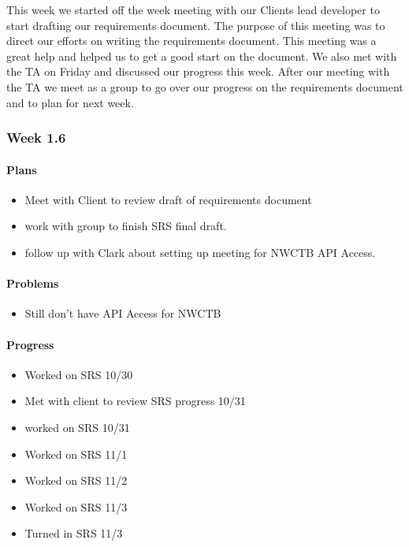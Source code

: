 \documentclass[onecolumn, draftclsnofoot,10pt, compsoc]{article}
\begin{document}
		        This week we started off the week meeting with our Clients lead developer to start drafting our requirements document. The purpose of this meeting was to direct our efforts on writing the requirements document. This meeting was a great help and helped us to get a good start on the document.  We also met with the TA on Friday and discussed our progress this week. After our meeting with the TA we meet as a group to go over our progress on the requirements document and to plan for next week.\\

		\subsubsection{Week 1.6}

		    \paragraph{Plans} \hfill \break

		        \begin{itemize}
		            \item Meet with Client to review draft of requirements document
		            \item work with group to finish SRS final draft.
		            \item follow up with Clark about setting up meeting for NWCTB API Access.
		        \end{itemize}

		    \paragraph{Problems} \hfill \break

		        \begin{itemize}
		            \item Still don't have API Access for NWCTB
		        \end{itemize}

		    \paragraph{Progress} \hfill \break

		        \begin{itemize}
		            \item Worked on SRS 10/30
		            \item Met with client to review SRS progress 10/31
		            \item worked on SRS 10/31
		            \item Worked on SRS 11/1
		            \item Worked on SRS 11/2
		            \item Worked on SRS 11/3
		            \item Turned in SRS 11/3
		        \end{itemize}
\end{document}
